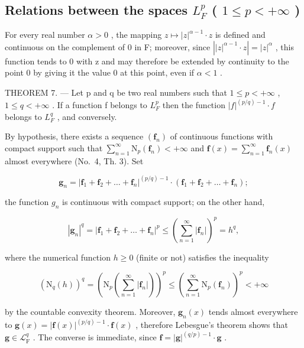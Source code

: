 \subsection{\texorpdfstring{Relations between the spaces \(L_{F}^{p}\) ( \(1 \leqslant p < +\infty\) )}{Relations between the spaces L sub F to the p ( 1 <= p < +infinity )}}

For every real number \(\alpha > 0\) , the mapping \(z \mapsto |z|^{\alpha-1} \cdot z\) is defined and continuous on the complement of 0 in F; moreover, since \(\left||z|^{\alpha-1} \cdot z\right| = |z|^{\alpha}\) , this function tends to 0 with z and may therefore be extended by continuity to the point 0 by giving it the value 0 at this point, even if \(\alpha < 1\) .

THEOREM 7. --- Let p and q be two real numbers such that \(1 \leqslant p < +\infty\) , \(1 \leqslant q < +\infty\) . If a function f belongs to \(L_{F}^{p}\) then the function \(|f|^{(p/q)-1} \cdot f\) belongs to \(L_{F}^{q}\) , and conversely.

By hypothesis, there exists a sequence \((\mathbf{f}_{n})\) of continuous functions with compact support such that \(\sum_{n=1}^{\infty}\mathrm{N}_{p}(\mathbf{f}_{n})<+\infty\) and \(\mathbf{f}(x)=\sum_{n=1}^{\infty}\mathbf{f}_{n}(x)\) almost everywhere (No.~4, Th. 3). Set

\[
\mathbf {g} _ {n} = | \mathbf {f} _ {1} + \mathbf {f} _ {2} + \dots + \mathbf {f} _ {n} | ^ {(p / q) - 1} \cdot (\mathbf {f} _ {1} + \mathbf {f} _ {2} + \dots + \mathbf {f} _ {n});
\]

the function \(g_{n}\) is continuous with compact support; on the other hand,

\[
\left| \mathbf {g} _ {n} \right| ^ {q} = \left| \mathbf {f} _ {1} + \mathbf {f} _ {2} + \dots + \mathbf {f} _ {n} \right| ^ {p} \leqslant \left(\sum_ {n = 1} ^ {\infty} \left| \mathbf {f} _ {n} \right|\right) ^ {p} = h ^ {q},
\]

where the numerical function \(h \geqslant 0\) (finite or not) satisfies the inequality

\[
\left(\mathrm{N} _ {q} (h)\right) ^ {q} = \left(\mathrm{N} _ {p} \left(\sum_ {n = 1} ^ {\infty} | \mathbf {f} _ {n} |\right)\right) ^ {p} \leqslant \left(\sum_ {n = 1} ^ {\infty} \mathrm{N} _ {p} (\mathbf {f} _ {n})\right) ^ {p} <   + \infty
\]

by the countable convexity theorem. Moreover, \(\mathbf{g}_n(x)\) tends almost everywhere to \(\mathbf{g}(x) = |\mathbf{f}(x)|^{(p/q)-1} \cdot \mathbf{f}(x)\) , therefore Lebesgue's theorem shows that \(\mathbf{g} \in \mathcal{L}_{\mathrm{F}}^q\) . The converse is immediate, since \(\mathbf{f} = |\mathbf{g}|^{(q/p)-1} \cdot \mathbf{g}\) .

